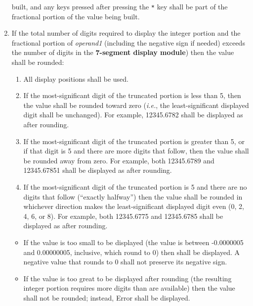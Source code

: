 \begin{enumerate}[resume]
    built, and any keys pressed after pressing the \texttt{*} key shall be
    part of the fractional portion of the value being built.
\item \label{spec:Rounding} If the total number of digits required to display
    the integer portion and the fractional portion of \textit{operand1}
    (including the negative sign if needed) exceeds the number of digits in the
    \textbf{7-segment display module}) then the value shall be rounded:
    \begin{enumerate}
    \item All display positions shall be used.
    \item If the most-significant digit of the truncated portion is less than
        5, then the value shall be rounded toward zero (\textit{i.e.}, the
        least-significant displayed digit shall be unchanged). For example,
        12345.6782 shall be displayed as {} after rounding.
    \item If the most-significant digit of the truncated portion is greater
        than 5, or if that digit is 5 and there are more digits that follow,
        then the value shall be rounded away from zero. For example, both
        12345.6789 and 12345.67851 shall be displayed as {}
        after rounding.
    \item If the most-significant digit of the truncated portion is 5 and there
        are no digits that follow (``exactly halfway'') then the value shall be
        rounded in whichever direction makes the least-significant displayed
        digit even (0, 2, 4, 6, or 8). For example, both 12345.6775 and
        12345.6785 shall be displayed as {} after rounding.
    \end{enumerate}
    \begin{itemize}
    \item If the value is too small to be displayed (the value is between
        -0.0000005 and 0.00000005, inclusive, which round to 0) then {} shall be displayed. A negative value that rounds to 0 shall not
        preserve its negative sign.
    \item If the value is too great to be displayed after rounding (the
        resulting integer portion requires more digits than are available) then
        the value shall not be rounded; instead, {\dviiseg Error} shall be
        displayed.
    \end{itemize}
\end{enumerate}

